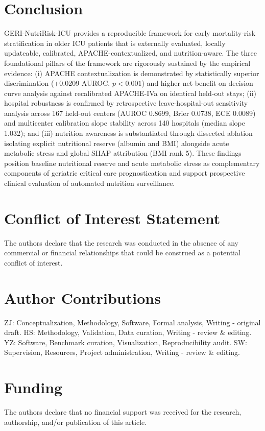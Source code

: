 \documentclass[utf8]{FrontiersinVancouver}
\newcommand{\re}[1]{#1}
\begin{document}
\section{Conclusion}

\re{GERI-NutriRisk-ICU provides a reproducible framework for early mortality-risk stratification in older ICU patients that is externally evaluated, locally updateable, calibrated, APACHE-contextualized, and nutrition-aware. The three foundational pillars of the framework are rigorously sustained by the empirical evidence: (i) APACHE contextualization is demonstrated by statistically superior discrimination (+0.0209 AUROC, $p<0.001$) and higher net benefit on decision curve analysis against recalibrated APACHE-IVa on identical held-out stays; (ii) hospital robustness is confirmed by retrospective leave-hospital-out sensitivity analysis across 167 held-out centers (AUROC 0.8699, Brier 0.0738, ECE 0.0089) and multicenter calibration slope stability across 140 hospitals (median slope 1.032); and (iii) nutrition awareness is substantiated through dissected ablation isolating explicit nutritional reserve (albumin and BMI) alongside acute metabolic stress and global SHAP attribution (BMI rank 5). These findings position baseline nutritional reserve and acute metabolic stress as complementary components of geriatric critical care prognostication and support prospective clinical evaluation of automated nutrition surveillance.}

\section*{Conflict of Interest Statement}
The authors declare that the research was conducted in the absence of any commercial or financial relationships that could be construed as a potential conflict of interest.

\section*{Author Contributions}
ZJ: Conceptualization, Methodology, Software, Formal analysis, Writing - original draft. HS: Methodology, Validation, Data curation, Writing - review \& editing. YZ: Software, Benchmark curation, Visualization, Reproducibility audit. SW: Supervision, Resources, Project administration, Writing - review \& editing.

\section*{Funding}
The authors declare that no financial support was received for the research, authorship, and/or publication of this article.
\end{document}
